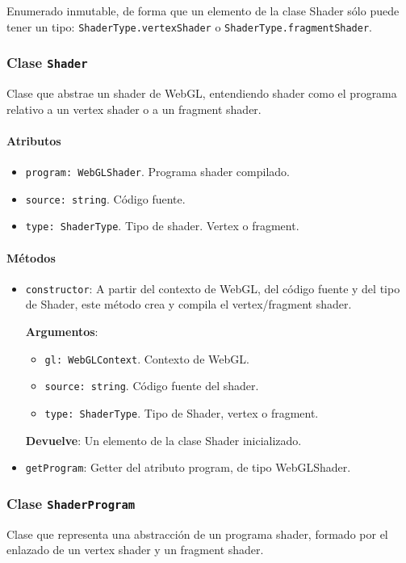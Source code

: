 Enumerado inmutable, de forma que un elemento de la clase Shader sólo puede tener un tipo: \verb|ShaderType.vertexShader| o \verb|ShaderType.fragmentShader|.

\subsubsection{Clase \Large\texttt{\textcolor{Bittersweet}{Shader}}}
Clase que abstrae un shader de WebGL, entendiendo shader como el programa relativo a un vertex shader o a un fragment shader. 

\paragraph*{Atributos}
\begin{itemize}
    \item \verb|program: WebGLShader|. Programa shader compilado.
    \item \verb|source: string|. Código fuente.
    \item \verb|type: ShaderType|. Tipo de shader. Vertex o fragment.
\end{itemize}

\paragraph*{Métodos}
\begin{itemize}
    \item \verb|constructor|: A partir del contexto de WebGL, del código fuente y del tipo de Shader, este método crea y compila el vertex/fragment shader.
    
    \textbf{Argumentos}:
    \begin{itemize}
        \item \verb|gl: WebGLContext|. Contexto de WebGL.
        \item \verb|source: string|. Código fuente del shader.
        \item \verb|type: ShaderType|. Tipo de Shader, vertex o fragment.
    \end{itemize}
    \textbf{Devuelve}: Un elemento de la clase Shader inicializado.

    \item \verb|getProgram|: Getter del atributo program, de tipo WebGLShader.
\end{itemize}

\subsubsection{Clase \Large\texttt{\textcolor{Bittersweet}{ShaderProgram}}}
Clase que representa una abstracción de un programa shader, formado por el enlazado de un vertex shader y un fragment shader.

